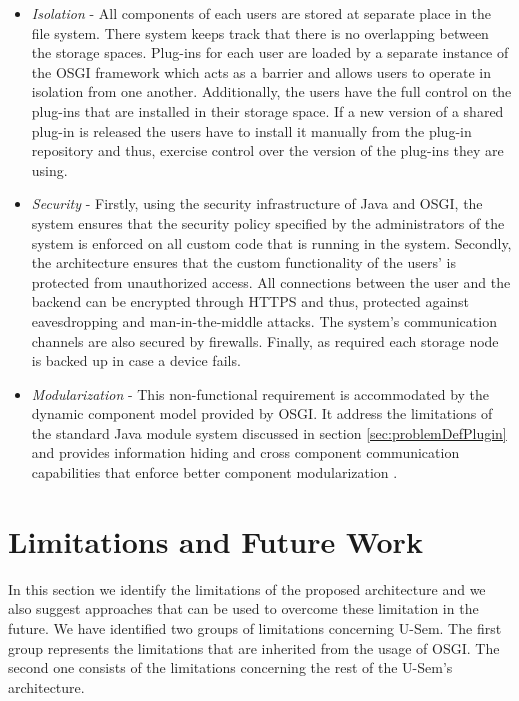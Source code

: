 \begin{itemize}

\item \textit{Isolation} - All components of each users are stored at separate place in the file system. There system keeps track that there is no overlapping between the storage spaces. Plug-ins for each user are loaded by a separate instance of the OSGI framework which acts as a barrier and allows users to operate in isolation from one another. Additionally, the users have the full control on the plug-ins that are installed in their storage space. If a new version of a shared plug-in is released the users have to install it manually from the plug-in repository and thus, exercise control over the version of the plug-ins they are using. 


\item \textit{Security} - Firstly, using the security infrastructure of Java and OSGI, the system ensures that the security policy specified by the administrators of the system is enforced on all custom code that is running in the system. Secondly, the architecture ensures that the custom functionality of the users' is protected from unauthorized access. All connections between the user and the backend can be encrypted through HTTPS and thus, protected against eavesdropping and man-in-the-middle attacks. The system's communication channels are also secured by firewalls. Finally, as required each storage node is backed up in case a device fails.

\item \textit{Modularization} - This non-functional requirement is accommodated by the dynamic component model provided by OSGI. It address the limitations of the standard Java module system discussed in section \ref{sec:problemDefPlugin} and provides information hiding and cross component communication capabilities that enforce better component modularization \cite{tavares2008gentle}.

\end{itemize}


\section{Limitations and Future Work}
\label{sec:limitsPlugin}

In this section we identify the limitations of the proposed architecture and we also suggest approaches that can be used to overcome these limitation in the future. We have identified two groups of limitations concerning U-Sem. The first group represents the limitations that are inherited from the usage of OSGI. The second one consists of the limitations concerning the rest of the U-Sem's architecture.

